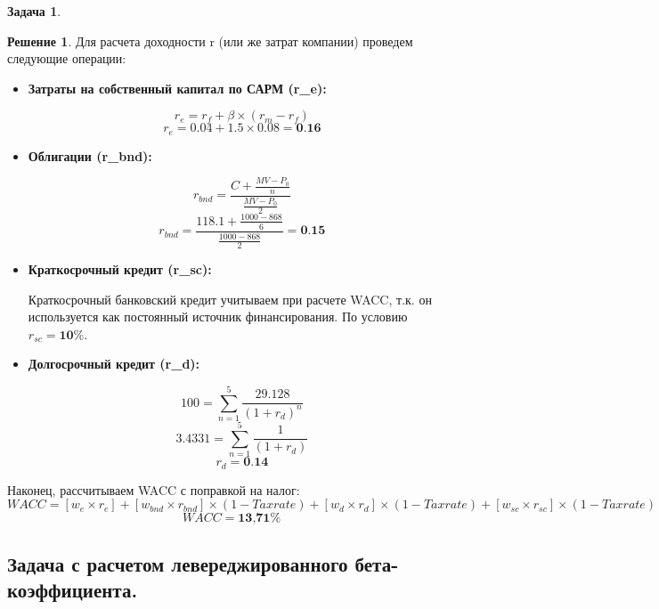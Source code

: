 \documentclass[a4paper, 14pt]{article}
\theoremstyle{plain} %
\theoremstyle{definition} %
\newtheorem*{solution}{Решение}
\newtheorem{problem}{Задача}[subsection]
\theoremstyle{remark} %
\begin{document}
\begin{problem}
\begin{solution}
Для расчета доходности r (или же затрат компании) проведем следующие операции:
\begin{itemize}
	\item \textbf{Затраты на собственный капитал по САРМ (r_{e}):}

	\[r_{e} = r_{f} + \beta \times (r_{m} - r_{f})\]
	\[r_{e} = 0.04 + 1.5 \times 0.08 = \textbf{0.16}\]
	\item \textbf{Облигации (r_{bnd}):}

	\[r_{bnd} = \frac{C + \frac{MV - P_{0}}{n}}{\frac{MV - P_{0}}{2}}\]
	\[r_{bnd} = \frac{118.1 + \frac{1000 - 868}{6}}{\frac{1000 - 868}{2}} = \textbf{0.15}\]
	\item \textbf{Краткосрочный кредит (r_{sc}):}

		Краткосрочный банковский кредит учитываем при расчете   WACC, т.к. он используется как постоянный источник финансирования. По условию $r_{sc} = \textbf{10\%}$.
	\item \textbf{Долгосрочный кредит (r_{d}):}

		\[100 = \sum_{n=1}^{5}\frac{29.128}{(1+r_{d})^{n}}\]
		\[3.4331 = \sum_{n=1}^{5}\frac{1}{(1+r_{d})}\]
		\[r_{d} = \textbf{0.14}\]
\end{itemize}

Наконец, рассчитываем WACC с поправкой на налог:
\[WACC = \left[w_{e}\times r_{e}\right] + \left[w_{bnd}\times r_{bnd}\right]\times (1-Taxrate) + \left[w_{d} \times r_{d}\right] \times (1-Taxrate) + \left[w_{sc} \times r_{sc}\right]\times (1-Taxrate)\]
\[WACC = \textbf{13,71\%}\]
\end{solution}
\end{problem}

\subsection{Задача с расчетом левереджированного бета-коэффициента.}
\end{document}
